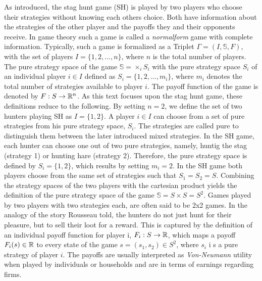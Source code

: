 \label{sec:traditional}
As introduced, the stag hunt game (SH) is played by two players who choose their
strategies without knowing each others choice.
Both have information about the strategies of the
other player and the payoffs they and their opponents receive. In game theory
such a game is called a \textit{normalform} game with complete information. 
Typically, such a game is formalized as a Triplet $\Gamma = (I,\mathbb{S},F)$, 
with the set of players $I=\{1,2,...,n\}$, where $n$ is the 
total number of players. The pure strategy space of the game 
$\mathbb{S} = \times_i S_i$ with the pure strategy space $S_i$ of an 
individual player  $i \in I$ defined as $S_i = \{1,2,...,m_i\}$, where $m_i$ 
denotes the total number of strategies available to player $i$. The payoff 
function of the game is denoted by $F: S \rightarrow \mathbb{R}^n$.
As this text focuses upon the stag hunt game, these definitions reduce to the 
following.
By setting $n=2$, we define the set of two hunters playing SH as $I=\{1,2\}$. A 
player $i \in I$  can choose from a set of pure strategies from his 
pure strategy space, $S_i$. The strategies are called pure to distinguish
them between the later introduced mixed strategies. 
In the SH game, each hunter can choose one out of two pure strategies, namely, 
huntig the stag (strategy 1) or hunting hare (strategy 2).
Therefore, the pure strategy space is defined by $S_i = \{1,2\}$, which results
by setting $m_i=2$. In the SH game both players choose from
the same set of strategies such that $S_1 =S_2=S$. Combining the strategy spaces
of the two players with the cartesian product
yields the definition of the pure strategy space of the game
$\mathbb{S}= S \times S = S^2$. Games played by two players with two strategies
each, are often said to be 2x2 games.    
In the analogy of the story Rousseau told, the hunters do not just hunt
for their pleasure, but to sell their loot for a reward. 
This is captured by the definition of an individual payoff function for player
i, $F_i:S \rightarrow \mathbb{R}$, which maps a payoff $F_i(s) \in \mathbb{R}$ 
to every state of the game $s=(s_1,s_2) \in S^2$, where $s_i$ i s a pure
strategy of player $i$.
The payoffs are usually interpreted as \textit{Von-Neumann} utility when 
played by individuals or households and are in terms of earnings regarding 
firms. 

